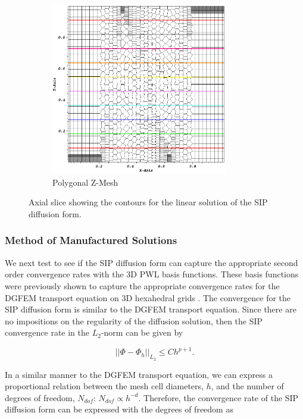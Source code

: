 \begin{figure}
\begin{subfigure}[b]{0.45\textwidth}
		\includegraphics[width=0.85\textwidth]{figures/sec_DSA/SIP_z_poly_lin_contour.png}
		\caption{Polygonal Z-Mesh}
	\end{subfigure}
\caption{Axial slice showing the contours for the linear solution of the SIP diffusion form.}
\label{fig::SIP_linear_sol}
\end{figure}

\subsubsection{Method of Manufactured Solutions}
\label{sec::DSA_Results_SIP_MMS}

We next test to see if the SIP diffusion form can capture the appropriate second order convergence rates with the 3D PWL basis functions. These basis functions were previously shown to capture the appropriate convergence rates for the DGFEM transport equation on 3D hexahedral grids \cite{bailey2008phd}. The convergence for the SIP diffusion form is similar to the DGFEM transport equation. Since there are no impositions on the regularity of the diffusion solution, then the SIP convergence rate in the $L_2$-norm can be given by

\begin{equation}
\label{eq::SIP_convergence_h}
|| \Phi - \Phi_h ||_{L_2} \leq C h^{p+1}.
\end{equation}

\noindent In a similar manner to the DGFEM transport equation, we can express a proportional relation between the mesh cell diameters, $h$, and the number of degrees of freedom, $N_{dof}$: $N_{dof} \propto h^{-d}$. Therefore, the convergence rate of the SIP diffusion form can be expressed with the degrees of freedom as 

